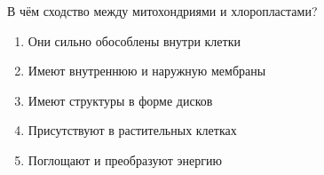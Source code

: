 
В чём сходство между
митохондриями и хлоропластами?

\begin{enumerate}
    \item Они сильно обособлены внутри клетки
    \item Имеют внутреннюю и наружную мембраны
    \item Имеют структуры в форме дисков
    \item Присутствуют в растительных клетках
    \item Поглощают и преобразуют энергию
\end{enumerate}



